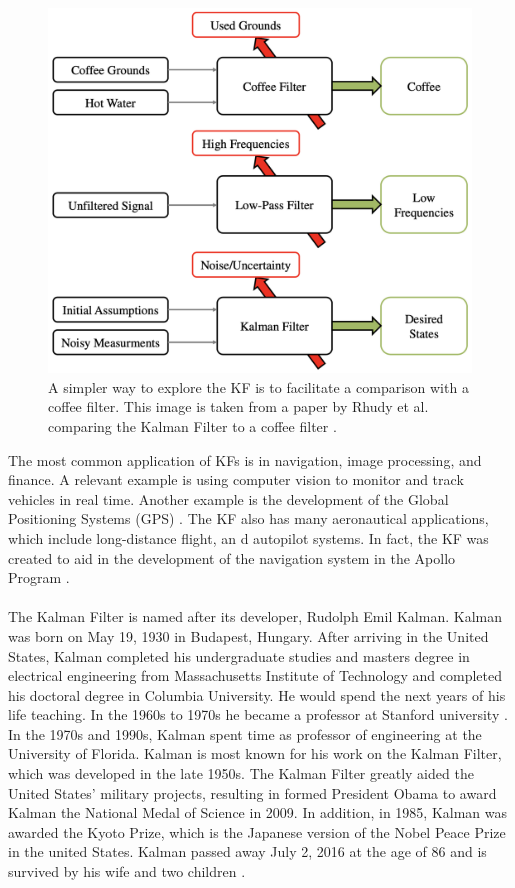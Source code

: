 \begin{figure}[h]
    \centering
    \includegraphics[scale = 0.3]{coffee.png}
    \caption{A simpler way to explore the KF is to facilitate a comparison with a coffee filter. This image is taken from a paper by Rhudy et al. comparing the Kalman Filter to a coffee filter \cite{article7}.}
    \end{figure}

\newpage

\noindent The most common application of KFs is in navigation, image processing, and finance. A relevant example is using computer vision to monitor and track vehicles in real time. Another example is the development of the Global Positioning Systems (GPS) \cite{lim_ong_lim_koo_2016}. The KF also has many aeronautical applications, which include long-distance flight,  an d autopilot systems. In fact, the KF was created to aid in the development of the navigation system in the Apollo Program \cite{kalmanbio}.  \\ \\


\noindent The Kalman Filter is named after its developer, Rudolph Emil Kalman. Kalman was born on May 19, 1930 in Budapest, Hungary. After arriving in the United States, Kalman completed his undergraduate studies and masters degree in electrical engineering from Massachusetts Institute of Technology  and completed his doctoral degree in Columbia University. He would spend the next years of his life teaching. In the 1960s to 1970s he became a professor at Stanford university \cite{kalmanbio}. In the 1970s and 1990s, Kalman spent time as professor of  engineering at the University of Florida. Kalman is most known for his work on the Kalman Filter, which was developed in the late 1950s. The Kalman Filter greatly aided the United States' military projects, resulting in formed President Obama to award Kalman the National Medal of Science in 2009. In addition, in 1985, Kalman was awarded the Kyoto Prize, which is the Japanese version of the Nobel Peace Prize in the united States. Kalman passed away July 2, 2016 at the age of 86 and is survived by his wife and two children \cite{Kalman_bio}. 


